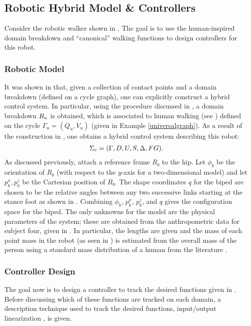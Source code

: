 \subsection{Robotic Hybrid Model \& Controllers} \noindent
Consider the robotic walker shown in . The goal is to use the human-inspired domain breakdown and ``canonical'' walking functions to design controllers for this robot.

\subsubsection{Robotic Model} It was shown in  that, given a collection of contact points and a domain breakdown (defined on a cycle graph), one can explicitly construct a hybrid control system. In particular, using the procedure discussed in , a domain breakdown $B_u$ is obtained, which is associated to human walking (see ) defined on the cycle $\Gamma_u = (Q_u,V_u)$ (given in Example \ref{universalgraph}).  As a result of the construction in , one obtains a hybrid control system describing this robot:
\begin{align}
  \label{eq:hcstime}
  \Sigma_{c} = (\Gamma, D, U, S, \Delta, FG).
\end{align}
As discussed previously, attach a reference frame $R_b$ to the hip. Let $\phi_b$
be the orientation of $R_b$ (with respect to the $y$-axis for a two-dimensional
model) and let $p_b^x, p_b^z$ be the Cartesian position of $R_b$. The shape
coordinates $q$ for the biped are chosen to be the relative angles between any
two successive links starting at the stance foot as shown in
. Combining $\phi_b$, $p_b^x$, $p_b^z$, and $q$ gives
the configuration space for the biped. The only unknowns for the model are the
physical parameters of the system; these are obtained from the anthropometric
data for subject four, given in . In particular, the
lengths are given and the mass of each point mass in the robot (as seen in
) is estimated from the overall mass of the person
using a standard mass distribution of a human from the literature
\cite{Winter2009}.

\subsubsection{Controller Design} The goal now is to design a controller to
track the desired functions given in . Before discussing
which of these functions are tracked on each domain, a description technique
used to track the desired functions, input/output linearization
\cite{Sastry1999}, is given.

